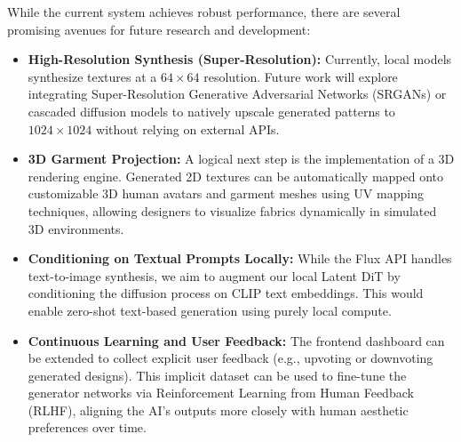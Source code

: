 \documentclass[12pt,a4paper]{article}
\begin{document}
While the current system achieves robust performance, there are several promising avenues for future research and development:
\begin{itemize}
    \item \textbf{High-Resolution Synthesis (Super-Resolution):} Currently, local models synthesize textures at a $64 \times 64$ resolution. Future work will explore integrating Super-Resolution Generative Adversarial Networks (SRGANs) or cascaded diffusion models to natively upscale generated patterns to $1024 \times 1024$ without relying on external APIs.
    \item \textbf{3D Garment Projection:} A logical next step is the implementation of a 3D rendering engine. Generated 2D textures can be automatically mapped onto customizable 3D human avatars and garment meshes using UV mapping techniques, allowing designers to visualize fabrics dynamically in simulated 3D environments.
    \item \textbf{Conditioning on Textual Prompts Locally:} While the Flux API handles text-to-image synthesis, we aim to augment our local Latent DiT by conditioning the diffusion process on CLIP text embeddings. This would enable zero-shot text-based generation using purely local compute.
    \item \textbf{Continuous Learning and User Feedback:} The frontend dashboard can be extended to collect explicit user feedback (e.g., upvoting or downvoting generated designs). This implicit dataset can be used to fine-tune the generator networks via Reinforcement Learning from Human Feedback (RLHF), aligning the AI's outputs more closely with human aesthetic preferences over time.
\end{itemize}
\end{document}
